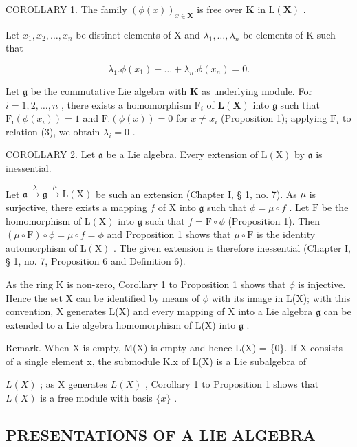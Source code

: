 COROLLARY 1. The family \((\phi (x))_{x\in \mathbf{X}}\) is free over \(\mathbf{K}\) in \(\mathrm{L}(\mathbf{X})\) .

Let \(x_{1}, x_{2}, \ldots, x_{n}\) be distinct elements of X and \(\lambda_{1}, \ldots, \lambda_{n}\) be elements of K such that

\[
\lambda_ {1}. \phi (x _ {1}) + \dots + \lambda_ {n}. \phi (x _ {n}) = 0.\tag{3}
\]

Let \(\mathfrak{g}\) be the commutative Lie algebra with \(\mathbf{K}\) as underlying module. For \(i = 1,2,\ldots ,n\) , there exists a homomorphism \(\mathrm{F}_i\) of \(\mathbf{L}(\mathbf{X})\) into \(\mathfrak{g}\) such that \(\mathrm{F_i}(\phi (x_i)) = 1\) and \(\mathrm{F_i}(\phi (x)) = 0\) for \(x\neq x_{i}\) (Proposition 1); applying \(\mathrm{F}_i\) to relation (3), we obtain \(\lambda_{i} = 0\) .

COROLLARY 2. Let \(\mathfrak{a}\) be a Lie algebra. Every extension of \(\mathrm{L}(\mathrm{X})\) by \(\mathfrak{a}\) is inessential.

Let \(\mathfrak{a} \xrightarrow{\lambda} \mathfrak{g} \xrightarrow{\mu} \mathrm{L}(\mathrm{X})\) be such an extension (Chapter I, § 1, no. 7). As \(\mu\) is surjective, there exists a mapping \(f\) of \(\mathrm{X}\) into \(\mathfrak{g}\) such that \(\phi = \mu \circ f\) . Let \(\mathrm{F}\) be the homomorphism of \(\mathrm{L}(\mathrm{X})\) into \(\mathfrak{g}\) such that \(f = \mathrm{F} \circ \phi\) (Proposition 1). Then \((\mu \circ \mathrm{F}) \circ \phi = \mu \circ f = \phi\) and Proposition 1 shows that \(\mu \circ \mathrm{F}\) is the identity automorphism of \(\mathrm{L}(\mathrm{X})\) . The given extension is therefore inessential (Chapter I, § 1, no. 7, Proposition 6 and Definition 6).

As the ring K is non-zero, Corollary 1 to Proposition 1 shows that \(\phi\) is injective. Hence the set X can be identified by means of \(\phi\) with its image in L(X); with this convention, X generates L(X) and every mapping of X into a Lie algebra \(\mathfrak{g}\) can be extended to a Lie algebra homomorphism of L(X) into \(\mathfrak{g}\) .

Remark. When X is empty, M(X) is empty and hence L(X) = \{0\}. If X consists of a single element x, the submodule K.x of L(X) is a Lie subalgebra of

\(L(X)\) ; as X generates \(L(X)\) , Corollary 1 to Proposition 1 shows that \(L(X)\) is a free module with basis \(\{x\}\) .

\subsection{PRESENTATIONS OF A LIE ALGEBRA}

